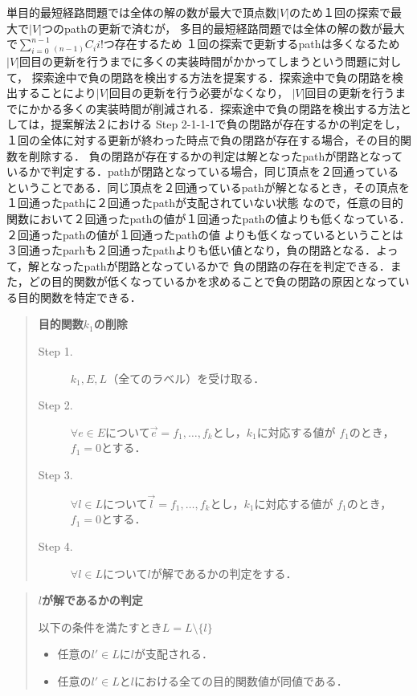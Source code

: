\documentclass[12pt]{optlab-bachelor}
\begin{document}
単目的最短経路問題では全体の解の数が最大で頂点数$|V|$のため１回の探索で最大で$|V|$つのpathの更新で済むが，
多目的最短経路問題では全体の解の数が最大で$\displaystyle \sum_{i=0}^{n-1} {}_{(n-1)}C_i i!$つ存在するため
１回の探索で更新するpathは多くなるため$|V|$回目の更新を行うまでに多くの実装時間がかかってしまうという問題に対して，
探索途中で負の閉路を検出する方法を提案する．探索途中で負の閉路を検出することにより$|V|$回目の更新を行う必要がなくなり，
$|V|$回目の更新を行うまでにかかる多くの実装時間が削減される．探索途中で負の閉路を検出する方法としては，提案解法２における
Step 2-1-1-1で負の閉路が存在するかの判定をし，１回の全体に対する更新が終わった時点で負の閉路が存在する場合，その目的関数を削除する．
負の閉路が存在するかの判定は解となったpathが閉路となっているかで判定する．pathが閉路となっている場合，同じ頂点を２回通っている
ということである．同じ頂点を２回通っているpathが解となるとき，その頂点を１回通ったpathに２回通ったpathが支配されていない状態
なので，任意の目的関数において２回通ったpathの値が１回通ったpathの値よりも低くなっている．２回通ったpathの値が１回通ったpathの値
よりも低くなっているということは３回通ったparhも２回通ったpathよりも低い値となり，負の閉路となる．よって，解となったpathが閉路となっているかで
負の閉路の存在を判定できる．また，どの目的関数が低くなっているかを求めることで負の閉路の原因となっている目的関数を特定できる．

\begin{quote}
  \textbf{目的関数$k_1$の削除}
  \begin{description}
    \item[Step 1.] $k_1,E,L$（全てのラベル）を受け取る．
    \item[Step 2.] $\forall e \in E$について$\vec{e}={f_1,\ldots,f_k}$とし，$k_1$に対応する値が
    $f_1$のとき，$f_1=0$とする．
    \item[Step 3.] $\forall l \in L$について$\vec{l}={f_1,\ldots,f_k}$とし，$k_1$に対応する値が
    $f_1$のとき，$f_1=0$とする．
    \item[Step 4.] $\forall l \in L$について$l$が解であるかの判定をする．
  \end{description}
\end{quote}

\begin{quote}
  \textbf{$l$が解であるかの判定}

  以下の条件を満たすとき$L=L \setminus \{ l\}$
    \begin{itemize}
      \item 任意の$l' \in L$に$l$が支配される．
      \item 任意の$l' \in L$と$l$における全ての目的関数値が同値である．
    \end{itemize}
\end{quote}
\end{document}
